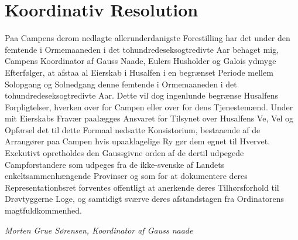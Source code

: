 

\begin{minipage}[b]{0.95\linewidth}
\begin{minipage}[t]{0.47\textwidth}
\vspace{3mm}
\section*{Koordinativ Resolution}

Paa Campens derom nedlagte allerunderdanigste Forestilling har det under den femtende i Ormemaaneden i det tohundredeseksogtredivte Aar behaget mig, Campens Koordinator af Gauss Naade, Eulers Husholder og Galois ydmyge Efterfølger, at afstaa al Eierskab i Husalfen i en begrænset Periode mellem Solopgang og Solnedgang denne femtende i Ormemaaneden i det tohundredeseksogtredivte Aar. Dette vil dog ingenlunde begrænse Husalfens Forpligtelser, hverken over for Campen eller over for dens Tjenestemænd. Under mit Eierskabs Fravær paalægges Ansvaret for Tilsynet over Husalfens Ve, Vel og Opførsel det til dette Formaal nedsatte Konsistorium, bestaaende af de Arrangører paa Campen hvis upaaklagelige Ry gør dem egnet til Hvervet. Exekutivt opretholdes den Gaussgivne orden af de dertil udpegede Campforstandere som udpeges fra de ikke-svenske af Landets enkeltsammenhængende Provinser og som for at dokumentere deres Representationbsret forventes offentligt at anerkende deres Tilhørsforhold til Drøvtyggerne Loge, og samtidigt sværve deres afstandstagen fra Ordinatorens magtfuldkommenhed.

{\flushright\emph{Morten Grue Sørensen, Koordinator af Gauss naade }}


\end{minipage}
\end{minipage}
